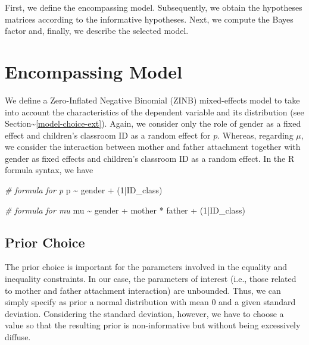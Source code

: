\documentclass[
]{book}
\newenvironment{Shaded}{\begin{snugshade}}{\end{snugshade}}
\newcommand{\CommentTok}[1]{\textcolor[rgb]{0.56,0.35,0.01}{\textit{#1}}}
\newcommand{\DecValTok}[1]{\textcolor[rgb]{0.00,0.00,0.81}{#1}}
\newcommand{\NormalTok}[1]{#1}
\newcommand{\SpecialCharTok}[1]{\textcolor[rgb]{0.00,0.00,0.00}{#1}}
\begin{document}
First, we define the encompassing model. Subsequently, we obtain the hypotheses matrices according to the informative hypotheses. Next, we compute the Bayes factor and, finally, we describe the selected model.

\hypertarget{encompassing-model}{%
\section{Encompassing Model}\label{encompassing-model}}

We define a Zero-Inflated Negative Binomial (ZINB) mixed-effects model to take into account the characteristics of the dependent variable and its distribution (see Section\textasciitilde\ref{model-choice-ext}). Again, we consider only the role of gender as a fixed effect and children's classroom ID as a random effect for \(p\). Whereas, regarding \(\mu\), we consider the interaction between mother and father attachment together with gender as fixed effects and children's classroom ID as a random effect. In the R formula syntax, we have

\begin{Shaded}
\begin{Highlighting}[]
\CommentTok{\# formula for p}
\NormalTok{p }\SpecialCharTok{\textasciitilde{}}\NormalTok{ gender }\SpecialCharTok{+}\NormalTok{ (}\DecValTok{1}\SpecialCharTok{|}\NormalTok{ID\_class)}

\CommentTok{\# formula for mu}
\NormalTok{mu }\SpecialCharTok{\textasciitilde{}}\NormalTok{ gender }\SpecialCharTok{+}\NormalTok{ mother }\SpecialCharTok{*}\NormalTok{ father }\SpecialCharTok{+}\NormalTok{ (}\DecValTok{1}\SpecialCharTok{|}\NormalTok{ID\_class)}
\end{Highlighting}
\end{Shaded}

\hypertarget{prior-choice}{%
\subsection{Prior Choice}\label{prior-choice}}

The prior choice is important for the parameters involved in the equality and inequality constraints. In our case, the parameters of interest (i.e., those related to mother and father attachment interaction) are unbounded. Thus, we can simply specify as prior a normal distribution with mean 0 and a given standard deviation. Considering the standard deviation, however, we have to choose a value so that the resulting prior is non-informative but without being excessively diffuse.
\end{document}
